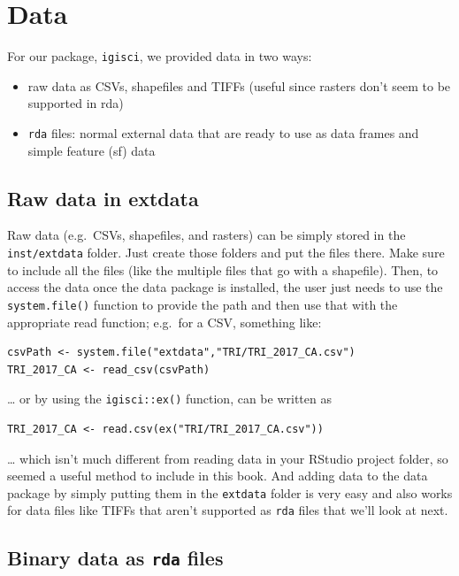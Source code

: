 \documentclass[
]{book}
\providecommand{\tightlist}{%
  \setlength{\itemsep}{0pt}\setlength{\parskip}{0pt}}
\begin{document}
\hypertarget{data-1}{%
\section*{Data}\label{data-1}}


For our package, \texttt{igisci}, we provided data in two ways:

\begin{itemize}
\tightlist
\item
  raw data as CSVs, shapefiles and TIFFs (useful since rasters don't seem to be supported in rda)
\item
  \texttt{rda} files: normal external data that are ready to use as data frames and simple feature (sf) data
\end{itemize}

\hypertarget{raw-data-in-extdata}{%
\subsection*{Raw data in extdata}\label{raw-data-in-extdata}}


Raw data (e.g.~CSVs, shapefiles, and rasters) can be simply stored in the \texttt{inst/extdata} folder. Just create those folders and put the files there. Make sure to include all the files (like the multiple files that go with a shapefile). Then, to access the data once the data package is installed, the user just needs to use the \texttt{system.file()} function to provide the path and then use that with the appropriate read function; e.g.~for a CSV, something like:

\begin{verbatim}
csvPath <- system.file("extdata","TRI/TRI_2017_CA.csv")
TRI_2017_CA <- read_csv(csvPath)
\end{verbatim}

\ldots{} or by using the \texttt{igisci::ex()} function, can be written as

\begin{verbatim}
TRI_2017_CA <- read.csv(ex("TRI/TRI_2017_CA.csv"))
\end{verbatim}

\ldots{} which isn't much different from reading data in your RStudio project folder, so seemed a useful method to include in this book. And adding data to the data package by simply putting them in the \texttt{extdata} folder is very easy and also works for data files like TIFFs that aren't supported as \texttt{rda} files that we'll look at next.

\hypertarget{binary-data-as-rda-files}{%
\subsection*{\texorpdfstring{Binary data as \texttt{rda} files}{Binary data as rda files}}\label{binary-data-as-rda-files}}
\end{document}
